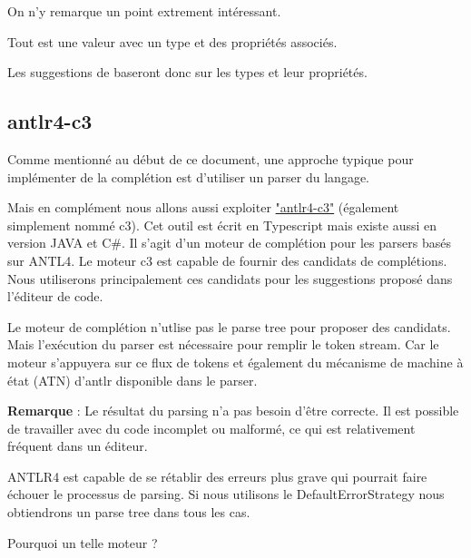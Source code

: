 \documentclass[
    iict, %
    il, %
]{heig-tb}
\begin{document}
On n'y remarque un point extrement intéressant.

Tout est une valeur avec un type et des propriétés associés.

Les suggestions de baseront donc sur les types et leur propriétés.


\subsection{antlr4-c3}

Comme mentionné au début de ce document, une approche typique pour implémenter de la complétion est d'utiliser un parser du langage.

Mais en complément nous allons aussi exploiter \href{https://github.com/mike-lischke/antlr4-c3}{"antlr4-c3"} (également simplement nommé c3).
Cet outil est écrit en Typescript mais existe aussi en version JAVA et C\#.
Il s'agit d'un moteur de complétion pour les parsers basés sur ANTL4. Le moteur c3 est capable de fournir des candidats de complétions.
Nous utiliserons principalement ces candidats pour les suggestions proposé dans l'éditeur de code.



Le moteur de complétion n'utlise pas le parse tree pour proposer des candidats. Mais l'exécution du parser est nécessaire pour remplir le token stream.
Car le moteur s'appuyera sur ce flux de tokens et également du mécanisme de machine à état (ATN) d'antlr disponible dans le parser.

\textbf{Remarque} : Le résultat du parsing n'a pas besoin d'être correcte. Il est possible de travailler avec du code incomplet ou malformé, ce qui est relativement fréquent dans un éditeur.

ANTLR4 est capable de se rétablir des erreurs plus grave qui pourrait faire échouer le processus de parsing.
Si nous utilisons le DefaultErrorStrategy nous obtiendrons un parse tree dans tous les cas.

Pourquoi un telle moteur ?
\end{document}
